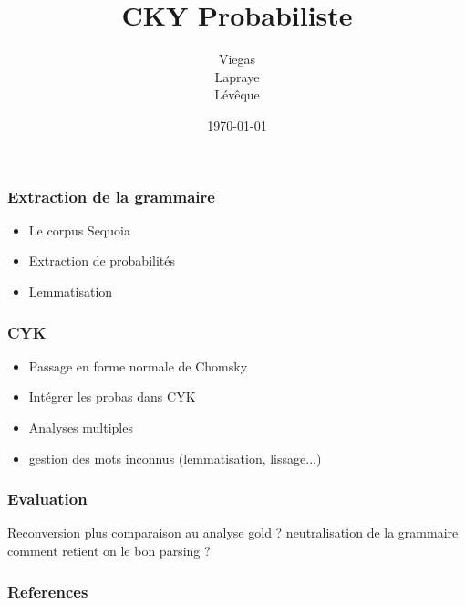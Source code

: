 \documentclass{beamer}
\begin{document}
\title{CKY Probabiliste}  %
\author{Viegas\\Lapraye\\Lévêque}

\date{\today}


\begin{frame}
 \maketitle
\end{frame}




\begin{frame}
\frametitle{Extraction de la grammaire}

\begin{itemize}
 \item<1-3> Le corpus Sequoia
 \item<2-3> Extraction de probabilités
 \item<3-3> Lemmatisation
\end{itemize}

 
\end{frame}

\begin{frame}
 \frametitle{CYK}
 \begin{itemize}
  \item<1-3>{Passage en forme normale de Chomsky}
  \item<2-3>{Intégrer les probas dans CYK}
  \item<3>Analyses multiples
    
  \item<4> gestion des mots inconnus (lemmatisation, lissage...)
 
 \end{itemize}

 
\end{frame}

\begin{frame}
\frametitle{Evaluation}
 Reconversion plus comparaison au analyse gold
? neutralisation de la grammaire
comment retient on le bon parsing ?
\end{frame}



\begin{frame}[allowframebreaks]
        \frametitle{References}
\end{frame}

%
%
%
%
%
%
\end{document}
